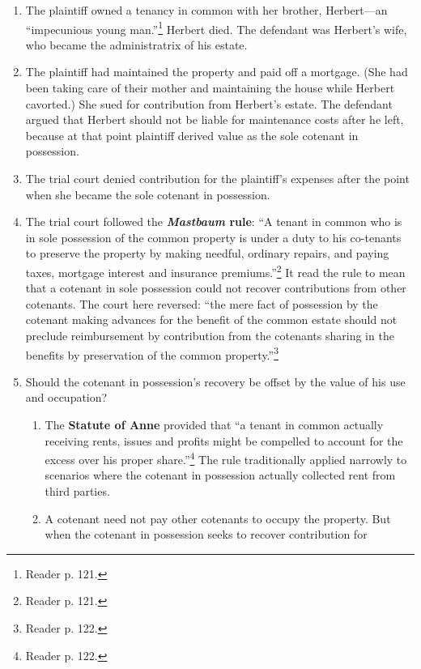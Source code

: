 \begin{enumerate}
    \item The plaintiff owned a tenancy in common with her brother, 
    Herbert---an ``impecunious young man.''\footnote{Reader p. 121.} Herbert 
    died. The defendant was Herbert's wife, who became the administratrix of 
    his estate.
    \item The plaintiff had maintained the property and paid off a mortgage. 
    (She had been taking care of their mother and maintaining the house while 
    Herbert cavorted.) She sued for contribution from Herbert's estate. 
    The defendant argued that Herbert should not be liable for maintenance 
    costs after he left, because at that point plaintiff derived value as the 
    sole cotenant in possession.
    \item The trial court denied contribution for the plaintiff's expenses 
    after the point when she became the sole cotenant in possession.
    \item The trial court followed the \textbf{\emph{Mastbaum} rule}: ``A 
    tenant in common who is in sole possession of the common property is under 
    a duty to his co-tenants to preserve the property by making needful, 
    ordinary repairs, and paying taxes, mortgage interest and insurance 
    premiums.''\footnote{Reader p. 121.} It read the rule to mean that a 
    cotenant in sole possession could not recover contributions from other 
    cotenants. The court here reversed: ``the mere fact of possession by the 
    cotenant making advances for the benefit of the common estate should not 
    preclude reimbursement by contribution from the cotenants sharing in the 
    benefits by preservation of the common property.''\footnote{Reader p.  
    122.}
    \item Should the cotenant in possession's recovery be offset by the value 
    of his use and occupation?
    \begin{enumerate}
        \item The \textbf{Statute of Anne} provided that ``a tenant in common 
        actually receiving rents, issues and profits might be compelled to 
        account for the excess over his proper share.''\footnote{Reader p. 
        122.} The rule traditionally applied narrowly to scenarios where 
        the cotenant in possession actually collected rent from third parties.  
        \item A cotenant need not pay other cotenants to occupy the property. 
        But when the cotenant in possession seeks to recover contribution for 

\end{enumerate}
\end{enumerate}
